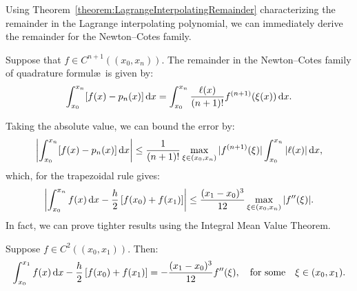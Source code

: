 Using Theorem~\ref{theorem:LagrangeInterpolatingRemainder} characterizing the remainder in the Lagrange interpolating polynomial, we can immediately derive the remainder for the Newton--Cotes family.
\begin{theorem}\label{theorem:NewtonCotesLIRError}
Suppose that $f\in C^{n+1}((x_0,x_n))$. The remainder in the Newton--Cotes family of quadrature formul\ae~is given by:
\begin{equation}
\int_{x_0}^{x_n}[f(x)-p_n(x)]{\rm\,d} x = \int_{x_0}^{x_n} \dfrac{\ell(x)}{(n+1)!}f^{(n+1)}(\xi(x)){\rm\,d} x.
\end{equation}
\end{theorem}
Taking the absolute value, we can bound the error by:
\[
\left|\int_{x_0}^{x_n}[f(x)-p_n(x)]{\rm\,d} x\right| \le \dfrac{1}{(n+1)!}\max_{\xi\in(x_0,x_n)}|f^{(n+1)}(\xi)|\int_{x_0}^{x_n} |\ell(x)|{\rm\,d} x,
\]
which, for the trapezoidal rule gives:
\[
\left|\int_{x_0}^{x_n}f(x)\ud x - \dfrac{h}{2}\br[f(x_0)+f(x_1)]\right| \le \dfrac{(x_1-x_0)^3}{12}\max_{\xi\in(x_0,x_n)}|f''(\xi)|.
\]
In fact, we can prove tighter results using the Integral Mean Value Theorem.
\begin{theorem}\label{theorem:TrapezoidalIMVTError}
Suppose $f\in C^2((x_0,x_1))$. Then:
\[
\int_{x_0}^{x_1}f(x)\ud x - \dfrac{h}{2}\br[f(x_0)+f(x_1)] = -\dfrac{(x_1-x_0)^3}{12}f''(\xi),\quad\hbox{for some}\quad \xi\in(x_0,x_1).
\]
\end{theorem}

